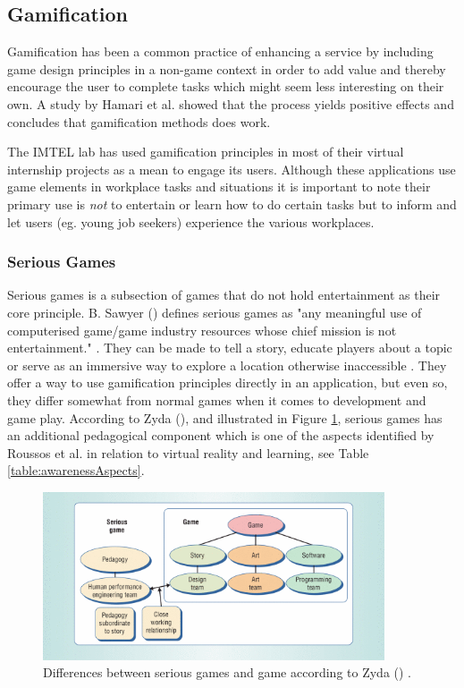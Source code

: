 \subsection{Gamification}
Gamification has been a common practice of enhancing a service by including game design principles in a non-game context in order to add value and thereby encourage the user to complete tasks which might seem less interesting on their own. A study by Hamari et al. \cite{hamari2014does} showed that the process yields positive effects and concludes that gamification methods does work.

The IMTEL lab has used gamification principles in most of their virtual internship projects as a mean to engage its users. Although these applications use game elements in workplace tasks and situations it is important to note their primary use is \textit{not} to entertain or learn how to do certain tasks but to inform and let users (eg. young job seekers) experience the various workplaces.      

\subsubsection{Serious Games}
Serious games is a subsection of games that do not hold entertainment as their core principle. B. Sawyer (\citeyear{sawyer2007serious}) defines serious games as "any meaningful use of computerised game/game industry resources whose chief mission is not entertainment." \cite{sawyer2007serious}.
They can be made to tell a story, educate players about a topic or serve as an immersive way to explore a location otherwise inaccessible \cite{susi2007serious}. They offer a way to use gamification principles directly in an application, but even so, they differ somewhat from normal games when it comes to development and game play. According to Zyda (\citeyear{zyda2005visual}), and illustrated in Figure \ref{fig:seriousGames}, serious games has an additional pedagogical component which is one of the aspects identified by Roussos et al. in relation to virtual reality and learning, see Table \ref{table:awarenessAspects}.   

\begin{figure}[!ht]
    \centering
    \includegraphics[width=0.9\textwidth]{./fig/background/seriousGames.png}
    \caption{Differences between serious games and game according to Zyda (\citeyear{zyda2005visual}) .}
    \label{fig:seriousGames}
\end{figure}

